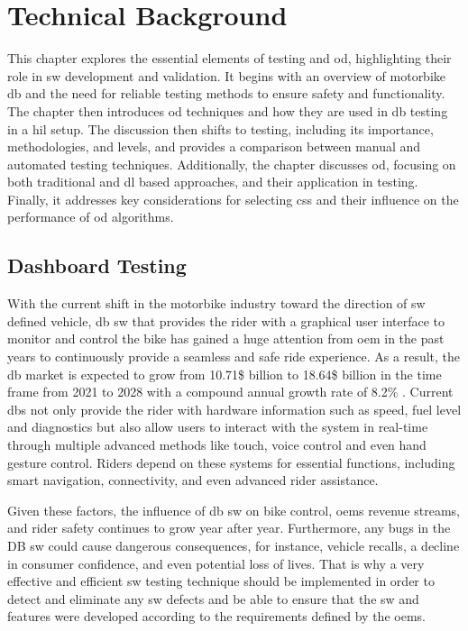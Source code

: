 \chapter{Technical Background} \label{ch:technical_background}
This chapter explores the essential elements of testing and \gls{od}, highlighting their role in \gls{sw} development and validation. It begins with an overview of motorbike \gls{db} and the need for reliable testing methods to ensure safety and functionality. The chapter then introduces \gls{od} techniques and how they are used in \gls{db} testing in a \gls{hil} setup. The discussion then shifts to testing, including its importance, methodologies, and levels, and provides a comparison between manual and automated testing techniques. Additionally, the chapter discusses \gls{od}, focusing on both traditional and \gls{dl} based approaches, and their application in testing. Finally, it addresses key considerations for selecting \gls{cs}s and their influence on the performance of \gls{od} algorithms.

\section{Dashboard Testing}
With the current shift in the motorbike industry toward the direction of \gls{sw} defined vehicle, \gls{db} \gls{sw} that provides the rider with a graphical user interface to monitor and control the bike has gained a huge attention from \gls{oem} in the past years to continuously provide a seamless and safe ride experience. As a result, the \gls{db} market is expected to grow from 10.71\$ billion to 18.64\$ billion in the time frame from 2021 to 2028 with a compound annual growth rate of 8.2\% \cite{DL_HMI_SW_V}. Current \gls{db}s not only provide the rider with hardware information such as speed, fuel level and diagnostics but also allow users to interact with the system in real-time through multiple advanced methods like touch, voice control and even hand gesture control.  Riders depend on these systems for essential functions, including smart navigation, connectivity, and even advanced rider assistance.

Given these factors, the influence of \gls{db} \gls{sw} on bike control, \gls{oem}s revenue streams, and rider safety continues to grow year after year. Furthermore, any bugs in the DB \gls{sw} could cause dangerous consequences, for instance, vehicle recalls, a decline in consumer confidence, and even potential loss of lives. That is why a very effective and efficient \gls{sw} testing technique should be implemented in order to detect and eliminate any \gls{sw} defects and be able to ensure that the \gls{sw} and features were developed according to the requirements defined by the \gls{oem}s.

